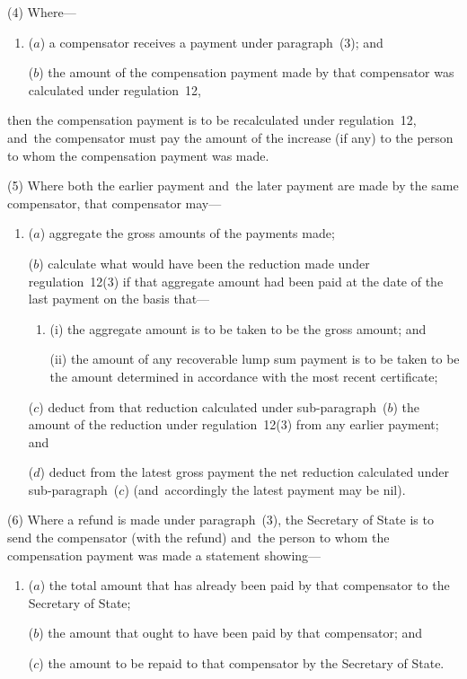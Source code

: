 \documentclass[12pt,a4paper]{article}
\begin{document}
(4) Where—
\begin{enumerate}\item[]
($a$) a compensator receives a payment under paragraph~(3); and

($b$) the amount of the compensation payment made by that compensator was calculated under regulation~12,
\end{enumerate}
then the compensation payment is to be recalculated under regulation~12, and~the compensator must pay the amount of the increase (if any) to the person to whom the compensation payment was made.

(5) Where both the earlier payment and~the later payment are made by the same compensator, that compensator may—
\begin{enumerate}\item[]
($a$) aggregate the gross amounts of the payments made;

($b$) calculate what would have been the reduction made under regulation~12(3) if that aggregate amount had been paid at the date of the last payment on the basis that—
\begin{enumerate}\item[]
(i) the aggregate amount is to be taken to be the gross amount; and

(ii) the amount of any recoverable lump sum payment is to be taken to be the amount determined in accordance with the most recent certificate;
\end{enumerate}

($c$) deduct from that reduction calculated under sub-paragraph~($b$)  the amount of the reduction under regulation~12(3) from any earlier payment; and

($d$) deduct from the latest gross payment the net reduction calculated under sub-paragraph~($c$)  (and~accordingly the latest payment may be nil).
\end{enumerate}

(6) Where a refund is made under paragraph~(3), the Secretary of State is to send the compensator (with the refund) and~the person to whom the compensation payment was made a statement showing—
\begin{enumerate}\item[]
($a$) the total amount that has already been paid by that compensator to the Secretary of State;

($b$) the amount that ought to have been paid by that compensator; and

($c$) the amount to be repaid to that compensator by the Secretary of State.
\end{enumerate}
\end{document}
